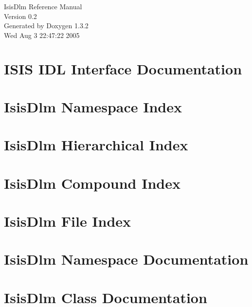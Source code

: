 \documentclass[a4paper]{book}
\begin{document}
\begin{titlepage}
\vspace*{7cm}
\begin{center}
{\Large Isis\-Dlm Reference Manual\\[1ex]\large Version 0.2 }\\
\vspace*{1cm}
{\large Generated by Doxygen 1.3.2}\\
\vspace*{0.5cm}
{\small Wed Aug 3 22:47:22 2005}\\
\end{center}
\end{titlepage}
\clearemptydoublepage
{}
\tableofcontents
\clearemptydoublepage
{}
\chapter{ISIS IDL Interface Documentation }
\label{index}
\chapter{Isis\-Dlm Namespace Index}

\chapter{Isis\-Dlm Hierarchical Index}

\chapter{Isis\-Dlm Compound Index}

\chapter{Isis\-Dlm File Index}

\chapter{Isis\-Dlm Namespace Documentation}


\chapter{Isis\-Dlm Class Documentation}













\end{document}
